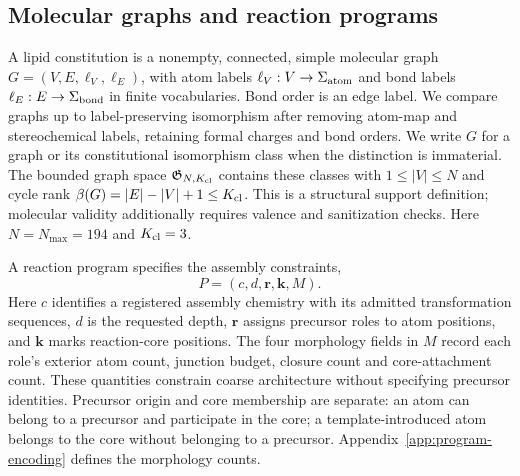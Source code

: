 \documentclass{article}
\theoremstyle{definition}
\begin{document}
\subsection{Molecular graphs and reaction programs}
\label{sec:mathematical-objects}
A lipid constitution is a nonempty, connected, simple molecular graph
$G=(V,E,\ell_V,\ell_E)$, with atom labels $\ell_V:V\to\Sigma_{\rm atom}$ and bond labels
$\ell_E:E\to\Sigma_{\rm bond}$ in finite vocabularies. Bond order is an edge label.
We compare graphs up to label-preserving isomorphism after removing atom-map and stereochemical
labels, retaining formal charges and bond orders. We write $G$ for a graph or its constitutional
isomorphism class when the distinction is immaterial. The bounded graph space
$\mathfrak G_{N,K_{\rm cl}}$ contains these classes with $1\leq|V|\leq N$ and cycle rank
$\beta(G)=|E|-|V|+1\leq K_{\rm cl}$. This is a structural support definition; molecular validity
additionally requires valence and sanitization checks. Here $N=N_{\max}=194$ and $K_{\rm cl}=3$.

A reaction program specifies the assembly constraints,
\begin{equation}
    P=(c,d,\mathbf r,\mathbf k,M).
    \label{eq:reaction-program}
\end{equation}
Here $c$ identifies a registered assembly chemistry with its admitted transformation sequences,
$d$ is the requested depth, $\mathbf r$ assigns precursor roles to
atom positions, and $\mathbf k$ marks reaction-core positions. The four morphology fields in $M$
record each role's exterior atom count, junction budget, closure count and core-attachment count.
These quantities constrain coarse architecture without specifying precursor identities. Precursor
origin and core membership are separate: an atom can belong to a precursor and participate in the
core; a template-introduced atom belongs to the core without belonging to a precursor.
Appendix~\ref{app:program-encoding} defines the morphology counts.
\end{document}
